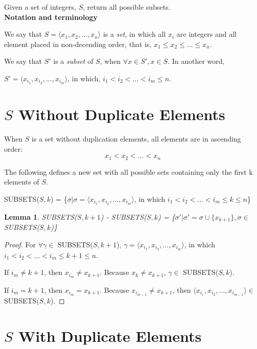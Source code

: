 \documentclass[a4paper, titlepage]{article}
\newtheorem{Lemma}{Lemma}
\begin{document}
Given a set of integers, $S$, return all possible subsets. \\

\textbf{Notation and terminology}

We say that $S = \langle x_1, x_2, \dots, x_n \rangle$ is a \emph{set}, in which all $x_i$ are integers and all element placed in non-decending order, that is, $ x_1 \leq x_2 \leq \dots \leq x_n $.


We say that $S'$ is a \emph{subset} of $S$, when $\forall x \in S', x \in S$. In another word,


$S' = \langle x_{i_1}, x_{i_2}, \dots, x_{i_m} \rangle$, in which, $i_1 < i_2 < \dots < i_m \leq n$.


\section{$S$ Without Duplicate Elements}
When $S$ is a set without duplication elements, all elements are in ascending order:
\[
 x_1 < x_2 < \dots < x_n 
\]

The following defines a new set with all possible sets containing only the first k elements of $S$.

SUBSETS($S,k$) = \{$\sigma | \sigma = \langle x_{i_1}, x_{i_2}, \dots, x_{i_m} \rangle$, in which $ i_1 < i_2 < \dots < i_m \leq k \leq n$\}

\begin{Lemma}
SUBSETS($S, k+1$) - SUBSETS($S, k$) = \{$\sigma' | \sigma' = \sigma \cup \{x_{k+1}\}, \sigma \in$ SUBSETS($S, k$)\}
\end{Lemma}
\begin{proof}
For $\forall \gamma \in$ SUBSETS($S, k+1$), $\gamma = \langle x_{i_1}, x_{i_2}, \dots, x_{i_m} \rangle$, in which $ i_1 < i_2 < \dots < i_m \leq k + 1 \leq n$.

If $i_m \neq k+1$, then $x_{i_m} \neq x_{k+1}$. Because $x_k \neq x_{k+1}$, $\gamma \in$ SUBSETS($S, k$).

If $i_m = k+1$, then $x_{i_m} = x_{k+1}$. Because $x_{i_{m-1}} \neq x_{k+1}$, then $\langle x_{i_1}, x_{i_2}, \dots, x_{i_{m-1}}\rangle \in$ SUBSETS($S, k$). 

\end{proof}
		
\section{$S$ With Duplicate Elements}
\end{document}
